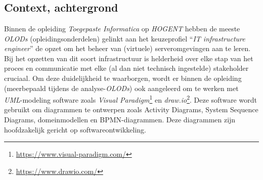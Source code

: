 
\chapter{}%
\label{ch:inleiding}



\section{Context, achtergrond}%
\label{sec:inl_context}

Binnen de opleiding \emph{Toegepaste Informatica} op \emph{HOGENT} hebben de meeste \emph{OLODs} (opleidingsonderdelen) gelinkt aan het keuzeprofiel ``\emph{IT infrastructure engineer}'' de opzet om het beheer van (virtuele) serveromgevingen aan te leren. Bij het opzetten van dit soort infrastructuur is helderheid over elke stap van het proces en communicatie met elke (al dan niet technisch ingestelde) stakeholder cruciaal.
Om deze duidelijkheid te waarborgen, wordt er binnen de opleiding (meerbepaald tijdens de analyse-\emph{OLODs}) ook aangeleerd om te werken met \emph{UML}-modeling software zoals \emph{Visual Paradigm}\footnote{\url{https://www.visual-paradigm.com/}} en \emph{draw.io}\footnote{\url{https://www.drawio.com/}}. Deze software wordt gebruikt om diagrammen te ontwerpen zoals Activity Diagrams, System Sequence Diagrams, domeinmodellen en BPMN-diagrammen. Deze diagrammen zijn hoofdzakelijk gericht op softwareontwikkeling.


